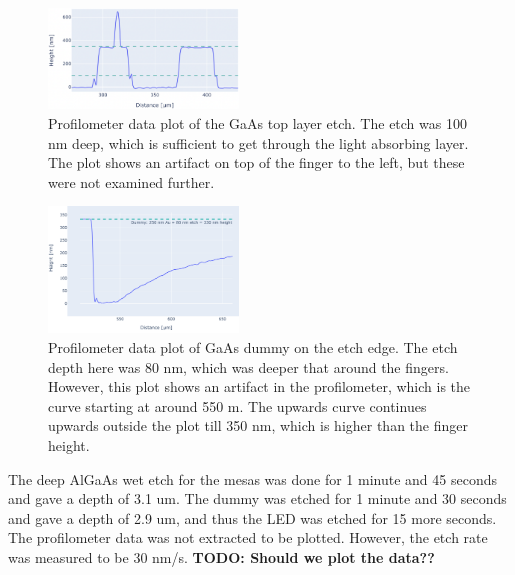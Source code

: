 \begin{figure}[ht]
    \centering
    \includegraphics[width=0.45\textwidth]{figures/LED_GaAs_100nm_etch.png}
    \caption{
        Profilometer data plot of the GaAs top layer etch. 
        The etch was 100 nm deep, which is sufficient to get through the light absorbing layer.
        The plot shows an artifact on top of the finger to the left, but these were not examined further.
    }
    \label{fig:profilometer_GaAs_100nm_etch}
\end{figure}

\begin{figure}[ht]
    \centering
    \includegraphics[width=0.45\textwidth]{figures/Dummy_GaAs_80nm_etch_lost_contact.png}
    \caption{
        Profilometer data plot of GaAs dummy on the etch edge. 
        The etch depth here was 80 nm, which was deeper that around the fingers. 
        However, this plot shows an artifact in the profilometer, which is the curve starting at around 550 \textmu m.
        The upwards curve continues upwards outside the plot till 350 nm, which is higher than the finger height.
    }
    \label{fig:Dummy_GaAs_80nm_etch_lost_contact}
\end{figure}



The deep AlGaAs wet etch for the mesas was done for 1 minute and 45 seconds and gave a depth of 3.1 um. 
The dummy was etched for 1 minute and 30 seconds and gave a depth of 2.9 um, and thus the LED was etched for 15 more seconds. 
The profilometer data was not extracted to be plotted. 
However, the etch rate was measured to be 30 nm/s.
\textbf{TODO: Should we plot the data??}

